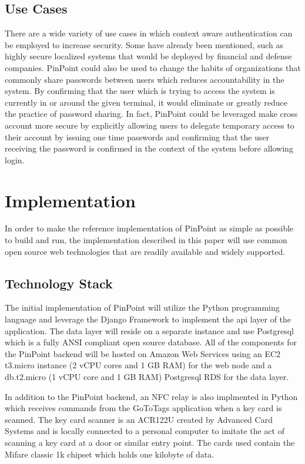 \documentclass[11pt,journal]{IEEEtran}
\begin{document}
\subsection{Use Cases}
There are a wide variety of use cases in which context aware authentication can be employed to increase security.  Some have already been mentioned, such as highly secure localized systems that would be deployed by financial and defense companies.  PinPoint could also be used to change the habits of organizations that commonly share passwords between users which reduces accountability in the system.  By confirming that the user which is trying to access the system is currently in or around the given terminal, it would eliminate or greatly reduce the practice of password sharing.  In fact, PinPoint could be leveraged make cross account more secure by explicitly allowing users to delegate temporary access to their account by issuing one time passwords and confirming that the user receiving the password is confirmed in the context of the system before allowing login.

\section{Implementation}
In order to make the reference implementation of PinPoint as simple as possible to build and run, the implementation described in this paper will use common open source web technologies that are readily available and widely supported.

\subsection{Technology Stack}
The initial implementation of PinPoint will utilize the Python\cite{python} programming language and leverage the Django Framework\cite{django} to implement the api layer of the application.  The data layer will reside on a separate instance and use Postgresql\cite{postgresql} which is a fully ANSI compliant open source database.  All of the components for the PinPoint backend will be hosted on Amazon Web Services\cite{aws} using an EC2 t3.micro instance (2 vCPU cores and 1 GB RAM) for the web node and a db.t2.micro (1 vCPU core and 1 GB RAM) Postgresql RDS for the data layer.

In addition to the PinPoint backend, an NFC relay is also implmented in Python which receives commands from the GoToTags\cite{gototags} application when a key card is scanned.  The key card scanner is an ACR122U created by Advanced Card Systems\cite{acr122u} and is locally connected to a personal computer to imitate the act of scanning a key card at a door or similar entry point.  The cards used contain the Mifare classic 1k chipset which holds one kilobyte of data.   
\end{document}
